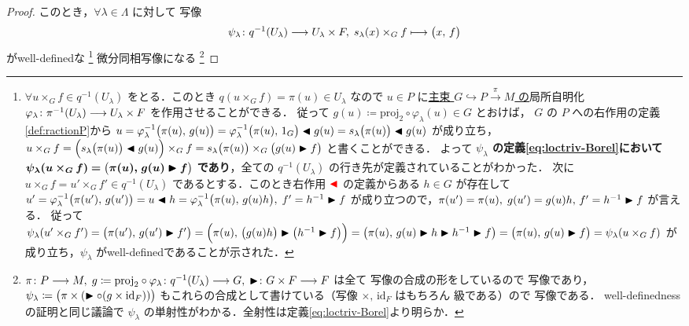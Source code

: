 \documentclass[TQFT_main]{subfiles}
\begin{document}
\begin{proof}
    このとき，$\forall \lambda \in \Lambda$ に対して \cinfty 写像
    \begin{align}
        \label{eq:loctriv-Borel}
        \psi_\lambda \colon q^{-1}(U_\lambda) \longrightarrow U_\lambda \times F,\; s_\lambda(x) \times_G f \longmapsto \bigl( x,\, f \bigr) 
    \end{align}
    がwell-definedな
    \footnote{$\forall u \times_G f \in q^{-1}(U_\lambda)$ をとる．このとき $q(u \times_G f) = \pi(u) \in U_\lambda$ なので $u \in P$ に\underline{主束 $G \hookrightarrow P \xrightarrow{\pi} M$ の}局所自明化 $\varphi_\lambda \colon \pi^{-1}(U_\lambda) \longrightarrow U_\lambda \times F$ を作用させることができる．
        従って $g(u) \coloneqq  \mathrm{proj}_2 \circ \varphi_\lambda (u) \in G$ とおけば，
        $G$ の $P$ への右作用の定義\eqref{def:ractionP}から $u = \varphi_\lambda^{-1} \bigl(\pi(u),\, g(u)\bigr) = \varphi_\lambda^{-1} \bigl( \pi(u),\, 1_G \bigr)  \blacktriangleleft g(u) = s_\lambda \bigl( \pi(u) \bigr)  \blacktriangleleft g(u)$ が成り立ち，$u \times_G f = \Bigl( s_\lambda \bigl( \pi(u) \bigr) \blacktriangleleft g(u) \Bigr) \times_G f =  s_\lambda \bigl( \pi(u) \bigr) \times_G \bigl(g(u) \blacktriangleright f\bigr)$ と書くことができる．
        よって \textbf{$\psi_\lambda$ の定義\eqref{eq:loctriv-Borel}において} $\bm{\psi_\lambda (u \times_G f) = \bigl( \pi(u),\, g(u) \blacktriangleright f \bigr)}$ \textbf{であり}，全ての $q^{-1}(U_\lambda)$ の行き先が定義されていることがわかった．
        次に $u \times_G f = u' \times_G f' \in q^{-1}(U_\lambda)$ であるとする．このとき右作用 $\textcolor{red}{\blacktriangleleft}$ の定義からある $h \in G$ が存在して $u' = \varphi_\lambda^{-1} \bigl( \pi(u'),\, g(u') \bigr) = u \blacktriangleleft h = \varphi_\lambda^{-1} \bigl( \pi(u),\, g(u) h \bigr),\; f' = h^{-1} \blacktriangleright f$ が成り立つので，$\pi(u') = \pi(u),\; g(u') = g(u)h,\, f' = h^{-1} \blacktriangleright f$ が言える．
        従って $\psi_\lambda(u' \times_G f') = \bigl( \pi(u'),\, g(u') \blacktriangleright f' \bigr) = \Bigl( \pi(u),\, \bigl(g(u) h\bigr) \blacktriangleright \bigl( h^{-1} \blacktriangleright f \bigr) \Bigr) = \bigl( \pi(u),\, g(u) \blacktriangleright h \blacktriangleright h^{-1} \blacktriangleright f \bigr) = \bigl( \pi(u),\, g(u) \blacktriangleright f \bigr) = \psi_\lambda (u \times_G f)$ が成り立ち，$\psi_\lambda$ がwell-definedであることが示された．
    }
    微分同相写像になる
    \footnote{
        $\pi \colon P \longrightarrow M,\; g \coloneqq \mathrm{proj}_2 \circ \varphi_\lambda \colon q^{-1}(U_\lambda) \longrightarrow G,\; \blacktriangleright \colon G \times F \longrightarrow F$ は全て \cinfty 写像の合成の形をしているので \cinfty 写像であり，$\psi_\lambda \coloneqq \bigl(\pi \times (\blacktriangleright \circ (g \times \mathrm{id}_F))\bigr)$ もこれらの合成として書けている（写像 $\times,\, \mathrm{id}_F$ はもちろん \cinfty 級である）ので \cinfty 写像である．
        well-definednessの証明と同じ議論で $\psi_\lambda$ の単射性がわかる．全射性は定義\eqref{eq:loctriv-Borel}より明らか．
}
\end{proof}
\end{document}

